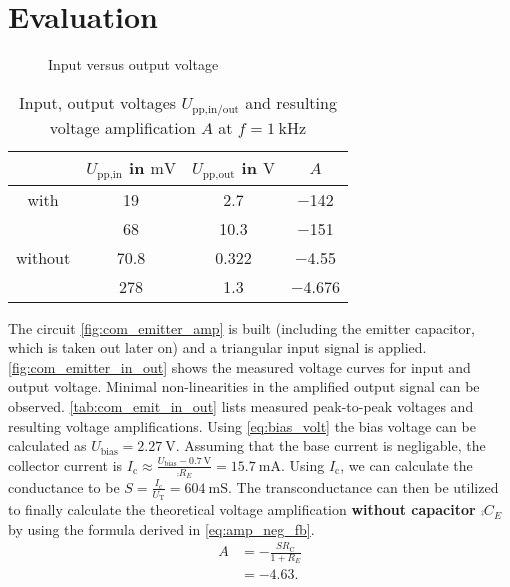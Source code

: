 \section{Evaluation}
\begin{figure}[tbp]
	\centering
	\caption{Input versus output voltage}
	\label{fig:com_emitter_in_out}
\end{figure}
\begin{table}[b!]
	\centering
	\caption{Input, output voltages $U_\text{pp,in/out}$ and resulting voltage amplification $A$ at $f=\SI{1}{\kilo\hertz}$}
	\label{tab:com_emit_in_out}
	\begin{tabular}{S|SSS}
		\toprule
		{}&	{$U_\text{pp,in}$ in $\si{\milli\volt}$}&	{$U_\text{pp,out}$ in $\si{\volt}$}&	{$A$}\\
		\midrule
		{with }	&	\num{19}	&	\num{2.7}	&	\num{-142}\\
		{}	&	\num{68}	&	\num{10.3}	&	\num{-151}\\
		\midrule
		{without }	&	\num{70.8}	&	\num{0.322}	&	\num{-4.55}\\
		{}	&	\num{278}	&	\num{1.3}	&	\num{-4.676}\\
		\bottomrule
	\end{tabular}
\end{table}
The circuit \autoref{fig:com_emitter_amp} is built (including the emitter capacitor, which is taken out later on) and a triangular input signal is applied.
\autoref{fig:com_emitter_in_out} shows the measured voltage curves for input and output voltage.
Minimal non-linearities in the amplified output signal can be observed.
\autoref{tab:com_emit_in_out} lists measured peak-to-peak voltages and resulting voltage amplifications.
Using \autoref{eq:bias_volt} the bias voltage can be calculated as $U_\text{bias}=\SI{2.27}{\volt}$.
Assuming that the base current is negligable, the collector current is $I_\text{c}\approx\frac{U_\text{bias}-\SI{0.7}{\volt}}{\comp{R_E}}=\SI{15.7}{\milli\ampere}$.
Using $I_\text{c}$, we can calculate the conductance to be $S=\frac{I_\text{c}}{U_\text{T}}=\SI{604}{\milli\siemens}$.
The transconductance can then be utilized to finally calculate the theoretical voltage amplification \textbf{without capacitor $\comp{C_E}$} by using the formula derived in \autoref{eq:amp_neg_fb}.
\begin{align*}
	A &= -\frac{SR_\text{C}}{1+R_E} \\
	&=\num{-4.63}.
\end{align*}
